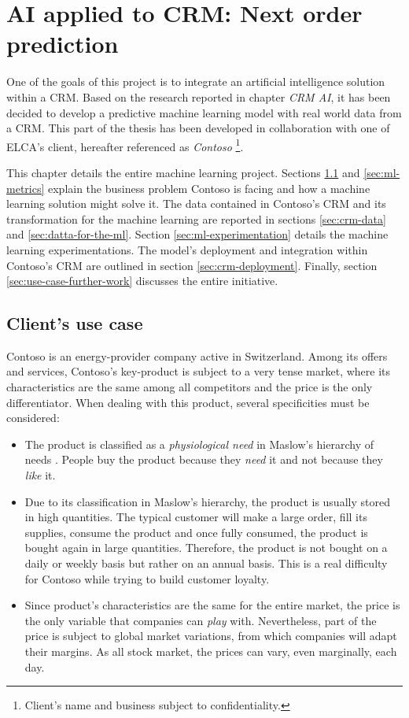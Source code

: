 \chapter{AI applied to CRM: Next order prediction} \label{chapter:use-case}

One of the goals of this project is to integrate an artificial intelligence solution within a CRM. Based on the research reported in chapter \textit{CRM AI}, it has been decided to develop a predictive machine learning model with real world data from a CRM. This part of the thesis has been developed in collaboration with one of ELCA's client, hereafter referenced as \textit{Contoso} \footnote{Client's name and business subject to confidentiality.}.

This chapter details the entire machine learning project. Sections \ref{sec:use-case} and \ref{sec:ml-metrics} explain the business problem Contoso is facing and how a machine learning solution might solve it. The data contained in Contoso's CRM and its transformation for the machine learning are reported in sections \ref{sec:crm-data} and \ref{sec:datta-for-the-ml}. Section \ref{sec:ml-experimentation} details the machine learning experimentations. The model's deployment and integration within Contoso's CRM are outlined in section \ref{sec:crm-deployment}. Finally, section \ref{sec:use-case-further-work} discusses the entire initiative.

\section{Client's use case} \label{sec:use-case}
Contoso is an energy-provider company active in Switzerland. Among its offers and services, Contoso's key-product is subject to a very tense market, where its characteristics are the same among all competitors and the price is the only differentiator. When dealing with this product, several specificities must be considered:
\begin{itemize}
    \item The product is classified as a \textit{physiological need} in Maslow's hierarchy of needs \cite{def:Maslow}. People buy the product because they \textit{need} it and not because they \textit{like} it.
    \item Due to its classification in Maslow's hierarchy, the product is usually stored in high quantities. The typical customer will make a large order, fill its supplies, consume the product and once fully consumed, the product is bought again in large quantities. Therefore, the product is not bought on a daily or weekly basis but rather on an annual basis. This is a real difficulty for Contoso while trying to build customer loyalty.
    \item Since product's characteristics are the same for the entire market, the price is the only variable that companies can \textit{play} with. Nevertheless, part of the price is subject to global market variations, from which companies will adapt their margins. As all stock market, the prices can vary, even marginally, each day.
\end{itemize}

